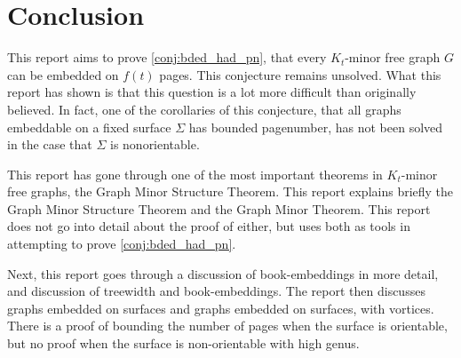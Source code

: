 \chapter{Conclusion}\label{chap:conclusion}

This report aims to prove \cref{conj:bded_had_pn}, that every $K_t$-minor free graph $G$ can be embedded on $f(t)$ pages. This conjecture remains unsolved. What this report has shown is that this question is a lot more difficult than originally believed. In fact, one of the corollaries of this conjecture, that all graphs embeddable on a fixed surface $\Sigma$ has bounded pagenumber, has not been solved in the case that $\Sigma$ is nonorientable. 

This report has gone through one of the most important theorems in $K_t$-minor free graphs, the Graph Minor Structure Theorem. This report explains briefly the Graph Minor Structure Theorem and the Graph Minor Theorem. This report does not go into detail about the proof of either, but uses both as tools in attempting to prove \cref{conj:bded_had_pn}. 

Next, this report goes through a discussion of book-embeddings in more detail, and discussion of treewidth and book-embeddings. The report then discusses graphs embedded on surfaces and graphs embedded on surfaces, with vortices. There is a proof of bounding the number of pages when the surface is orientable, but no proof when the surface is non-orientable with high genus. 